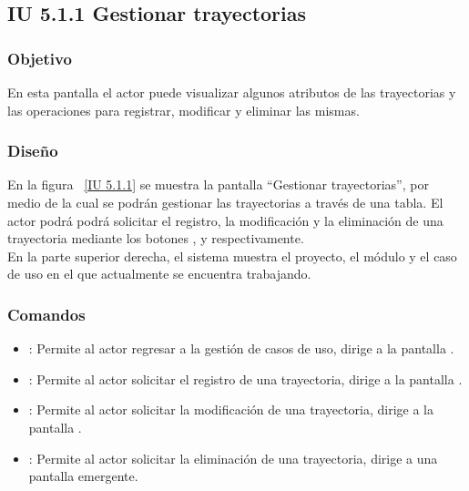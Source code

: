 \newpage 
\subsection{IU 5.1.1 Gestionar trayectorias}
\subsubsection{Objetivo}
	
	En esta pantalla el actor puede visualizar algunos atributos de las trayectorias y las operaciones para registrar, modificar y eliminar las mismas.

\subsubsection{Diseño}

    En la figura ~\ref{IU 5.1.1} se muestra la pantalla ``Gestionar trayectorias'', por medio de la cual 
    se podrán gestionar las trayectorias a través de una tabla.
    El actor podrá podrá solicitar el registro, la modificación y la eliminación de una trayectoria mediante los botones
    , \btnEditar y \btnEliminar respectivamente. \\
	
	En la parte superior derecha, el sistema muestra el proyecto, el módulo y el caso de uso en el que actualmente se encuentra trabajando.
	



\subsubsection{Comandos}
\begin{itemize}
	\item {}: Permite al actor regresar a la gestión de casos de uso, dirige a la pantalla .
	\item {}: Permite al actor solicitar el registro de una trayectoria, dirige a la pantalla .
	\item \btnEditar[Modificar]: Permite al actor solicitar la modificación de una trayectoria, dirige a la pantalla .
	\item \btnEliminar[Eliminar]: Permite al actor solicitar la eliminación de una trayectoria, dirige a una pantalla emergente.
\end{itemize}

